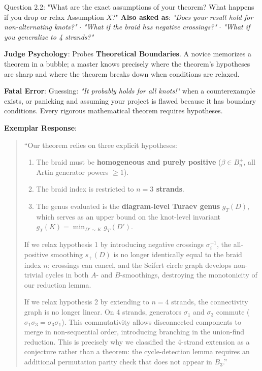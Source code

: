 \documentclass[11pt,letterpaper]{article}
\begin{document}
\begin{questionbox}{Question 2.2: "What are the exact assumptions of your theorem? What happens if you drop or relax Assumption $X$?"}
\textbf{Also asked as}: \textit{"Does your result hold for non-alternating knots?"} $\cdot$ \textit{"What if the braid has negative crossings?"} $\cdot$ \textit{"What if you generalize to 4 strands?"}
\end{questionbox}

\begin{strategybox}
\textbf{Judge Psychology}: Probes \textbf{Theoretical Boundaries}. A novice memorizes a theorem in a bubble; a master knows precisely where the theorem's hypotheses are sharp and where the theorem breaks down when conditions are relaxed.
\end{strategybox}

\begin{trapbox}
\textbf{Fatal Error}: Guessing: \textit{"It probably holds for all knots!"} when a counterexample exists, or panicking and assuming your project is flawed because it has boundary conditions. Every rigorous mathematical theorem requires hypotheses.
\end{trapbox}

\begin{exemplarbox}
\textbf{Exemplar Response}:
\begin{quote}
``Our theorem relies on three explicit hypotheses:
\begin{enumerate}
    \item The braid must be \textbf{homogeneous and purely positive} ($\beta \in B_n^+$, all Artin generator powers $\geq 1$).
    \item The braid index is restricted to \textbf{$n=3$ strands}.
    \item The genus evaluated is the \textbf{diagram-level Turaev genus} $g_T(D)$, which serves as an upper bound on the knot-level invariant $g_T(K) = \min_{D' \sim K} g_T(D')$.
\end{enumerate}

If we relax hypothesis 1 by introducing negative crossings $\sigma_i^{-1}$, the all-positive smoothing $s_+(D)$ is no longer identically equal to the braid index $n$; crossings can cancel, and the Seifert circle graph develops non-trivial cycles in both $A$- and $B$-smoothings, destroying the monotonicity of our reduction lemma.

If we relax hypothesis 2 by extending to $n=4$ strands, the connectivity graph is no longer linear. On 4 strands, generators $\sigma_1$ and $\sigma_3$ commute ($\sigma_1 \sigma_3 = \sigma_3 \sigma_1$). This commutativity allows disconnected components to merge in non-sequential order, introducing branching in the union-find reduction. This is precisely why we classified the 4-strand extension as a conjecture rather than a theorem: the cycle-detection lemma requires an additional permutation parity check that does not appear in $B_3$.''
\end{quote}
\end{exemplarbox}
\end{document}
